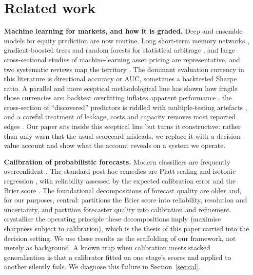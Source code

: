 \documentclass{sbc2023}%
\theoremstyle{definition}
\theoremstyle{plain}
\begin{document}
\section{Related work}
\label{sec:related}
\noindent\textbf{Machine learning for markets, and how it is graded.}
Deep and ensemble models for equity prediction are now routine. Long short-term
memory networks \citep{fischer2018}, gradient-boosted trees and random forests
for statistical arbitrage \citep{krauss2017}, and large cross-sectional studies of
machine-learning asset pricing \citep{gu2020} are representative, and two
systematic reviews map the territory \citep{sezer2020,jiang2021}. The dominant
evaluation currency in this literature is directional accuracy or AUC, sometimes a
backtested Sharpe ratio. A parallel and more sceptical methodological line has shown
how fragile those currencies are: backtest overfitting inflates apparent performance
\citep{bailey2017}, the cross-section of ``discovered'' predictors is riddled with
multiple-testing artefacts \citep{harvey2016}, and a careful treatment of leakage,
costs and capacity removes most reported edges \citep{lopezdeprado2018}. Our paper sits
inside this sceptical line but turns it constructive: rather than only warn that the
usual scorecard misleads, we replace it with a decision-value account and show what
the account reveals on a system we operate.

\noindent\textbf{Calibration of probabilistic forecasts.}
Modern classifiers are frequently overconfident \citep{guo2017}. The standard
post-hoc remedies are Platt scaling \citep{platt1999} and isotonic regression
\citep{zadrozny2002}, with reliability assessed by the expected calibration
error \citep{naeini2015} and the Brier score \citep{brier1950,niculescu2005}. The foundational decompositions of forecast quality are older and,
for our purposes, central: \citet{murphy1973} partitions the Brier score into reliability,
resolution and uncertainty, and \citet{degroot1983} partition forecaster
quality into calibration and refinement. \citet{gneiting2007} crystallise the
operating principle these decompositions imply (maximise sharpness subject to
calibration), which is the thesis of this paper carried into the decision setting.
We use these results as the scaffolding of our framework, not merely as background.
A known trap when calibration meets stacked generalisation
\citep{wolpert1992} is that a calibrator fitted on one stage's scores and applied to
another silently fails. We diagnose this failure in Section~\ref{sec:cal}.
\end{document}

